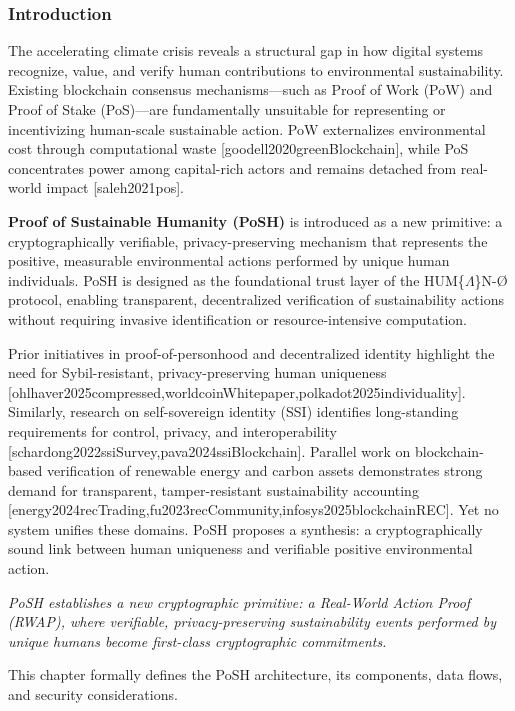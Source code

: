 \documentclass{article}
\begin{document}
\subsubsection{Introduction}

The accelerating climate crisis reveals a structural gap in how digital systems
recognize, value, and verify human contributions to environmental sustainability.
Existing blockchain consensus mechanisms---such as Proof of Work (PoW) and Proof
of Stake (PoS)---are fundamentally unsuitable for representing or incentivizing
human-scale sustainable action. PoW externalizes environmental cost through
computational waste [goodell2020greenBlockchain], while PoS concentrates power among capital-rich actors and
remains detached from real-world impact [saleh2021pos].

\textbf{Proof of Sustainable Humanity (PoSH)} is introduced as a new primitive:
a cryptographically verifiable, privacy-preserving mechanism that represents the
positive, measurable environmental actions performed by unique human individuals.
PoSH is designed as the foundational trust layer of the HUM\{$\Lambda$\}N-Ø
protocol, enabling transparent, decentralized verification of sustainability
actions without requiring invasive identification or resource-intensive
computation.

Prior initiatives in proof-of-personhood and decentralized identity highlight
the need for Sybil-resistant, privacy-preserving human uniqueness
[ohlhaver2025compressed,worldcoinWhitepaper,polkadot2025individuality].
Similarly, research on self-sovereign identity (SSI) identifies long-standing
requirements for control, privacy, and interoperability
[schardong2022ssiSurvey,pava2024ssiBlockchain]. Parallel work on
blockchain-based verification of renewable energy and carbon assets demonstrates
strong demand for transparent, tamper-resistant sustainability accounting
[energy2024recTrading,fu2023recCommunity,infosys2025blockchainREC].
Yet no system unifies these domains. PoSH proposes a synthesis: a
cryptographically sound link between human uniqueness and verifiable positive
environmental action.

\textit{PoSH establishes a new cryptographic primitive: a Real-World
Action Proof (RWAP), where verifiable, privacy-preserving sustainability events
performed by unique humans become first-class cryptographic commitments.}

This chapter formally defines the PoSH architecture, its components, data flows,
and security considerations.
\end{document}
